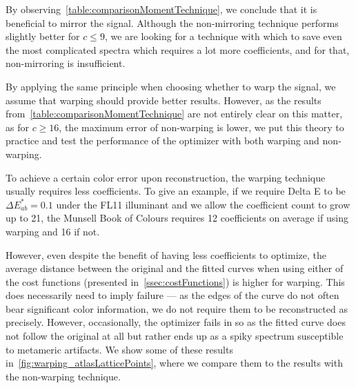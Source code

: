 By observing~\cref{table:comparisonMomentTechnique}, we conclude that it is beneficial to mirror the signal. Although the non-mirroring technique performs slightly better for $c \le 9$, we are looking for a technique with which to save even the most complicated spectra which requires a lot more coefficients, and for that, non-mirroring is insufficient.

By applying the same principle when choosing whether to warp the signal, we assume that warping should provide better results. However, as the results from~\cref{table:comparisonMomentTechnique} are not entirely clear on this matter, as for $c \ge 16$, the maximum error of non-warping is lower, we put this theory to practice and test the performance of the optimizer with both warping and non-warping. 

To achieve a certain color error upon reconstruction, the warping technique usually requires less coefficients. To give an example, if we require Delta E to be $\Delta E_{ab}^*=0.1$ under the FL11 illuminant and we allow the coefficient count to grow up to 21, the Munsell Book of Colours requires 12 coefficients on average if using warping and 16 if not.

However, even despite the benefit of having less coefficients to optimize, the average distance between the original and the fitted curves when using either of the cost functions (presented in~\cref{ssec:costFunctions}) is higher for warping. This does necessarily need to imply failure --- as the edges of the curve do not often bear significant color information, we do not require them to be reconstructed as precisely. However, occasionally, the optimizer fails in so as the fitted curve does not follow the original at all but rather ends up as a spiky spectrum susceptible to metameric artifacts. We show some of these results in~\cref{fig:warping_atlasLatticePoints}, where we compare them to the results with the non-warping technique.


